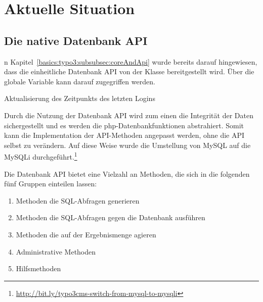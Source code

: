 \chapter{Aktuelle Situation}
\label{sec:currentSituation}
\section{Die native Datenbank API}
n Kapitel~\ref{basics:typo3:subsubsec:coreAndApi} wurde bereits darauf hingewiesen, dass die einheitliche Datenbank API von der Klasse  bereitgestellt wird. Über die globale Variable  kann darauf zugegriffen werden.

\begin{listing}[H]
	\caption{Aktualisierung des Zeitpunkts des letzten Logins}
	\label{lst:databaseOldExample}
\end{listing}

Durch die Nutzung der Datenbank API wird zum einen die Integrität der Daten sichergestellt und es werden die \gls{php}-Datenbankfunktionen abstrahiert. Somit kann die Implementation der API-Methoden angepasst werden, ohne die API selbst zu verändern. Auf diese Weise wurde die Umstellung von MySQL auf die MySQLi durchgeführt.\footnote{\url{http://bit.ly/typo3cms-switch-from-mysql-to-mysqli}}

Die Datenbank API bietet eine Vielzahl an Methoden, die sich in die folgenden fünf Gruppen einteilen lassen:

\begin{enumerate}
	\item Methoden die SQL-Abfragen generieren
	\item Methoden die SQL-Abfragen gegen die Datenbank ausführen
	\item Methoden die auf der Ergebnismenge agieren
	\item Administrative Methoden
	\item Hilfsmethoden
\end{enumerate}

